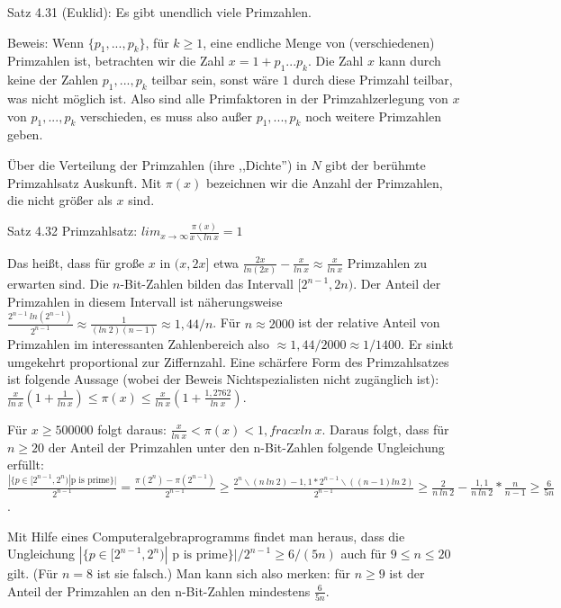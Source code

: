 \documentclass[a4paper]{article}
\begin{document}
\begin{multicols}{3}
        Satz 4.31 (Euklid): Es gibt unendlich viele Primzahlen.

        Beweis: Wenn $\{p_1,...,p_k\}$, für $k\geq 1$, eine endliche Menge von (verschiedenen) Primzahlen ist, betrachten wir die Zahl $x=1+p_1...p_k$. Die Zahl $x$ kann durch keine der Zahlen $p_1,...,p_k$ teilbar sein, sonst wäre $1$ durch diese Primzahl teilbar, was nicht möglich ist. Also sind alle Primfaktoren in der Primzahlzerlegung von $x$ von $p_1,...,p_k$ verschieden, es muss also außer $p_1,...,p_k$ noch weitere Primzahlen geben.

        Über die Verteilung der Primzahlen (ihre ,,Dichte'') in $N$ gibt der berühmte Primzahlsatz Auskunft. Mit $\pi(x)$ bezeichnen wir die Anzahl der Primzahlen, die nicht größer als $x$ sind.

        Satz 4.32 Primzahlsatz: $lim_{x\rightarrow \infty} \frac{\pi(x)}{x\backslash ln\ x}= 1$

        Das heißt, dass für große $x$ in $(x,2x]$ etwa $\frac{2x}{ln(2x)}-\frac{x}{ln\ x}\approx \frac{x}{ln\ x}$ Primzahlen zu erwarten sind. Die $n$-Bit-Zahlen bilden das Intervall $[2^{n-1} , 2n)$. Der Anteil der Primzahlen in diesem Intervall ist näherungsweise $\frac{2^{n-1}\ ln(2^{n-1})}{2^{n-1}}\approx \frac{1}{(ln\ 2)(n-1)}\approx 1,44/n$.
        Für $n\approx 2000$ ist der relative Anteil von Primzahlen im interessanten Zahlenbereich also $\approx 1,44/2000\approx 1/1400$. Er sinkt umgekehrt proportional zur Ziffernzahl.
        Eine schärfere Form des Primzahlsatzes ist folgende Aussage (wobei der Beweis Nichtspezialisten nicht zugänglich ist): $\frac{x}{ln\ x}(1+\frac{1}{ln\ x})\leq \pi(x)\leq \frac{x}{ln\ x}(1+\frac{1,2762}{ln\ x})$.

        Für $x\geq 500 000$ folgt daraus: $\frac{x}{ln\ x}< \pi(x)< 1, frac{x}{ln\ x}$.
        Daraus folgt, dass für $n\geq 20$ der Anteil der Primzahlen unter den n-Bit-Zahlen folgende Ungleichung erfüllt: $\frac{|\{p\in [2^{n-1}, 2^n)| \text{p is prime}\}|}{2^{n-1}} = \frac{\pi(2^n)-\pi(2^{n-1})}{2^{n-1}} \geq \frac{2^n\backslash (n\ ln\ 2)- 1,1*2^{n-1}\backslash ((n-1)ln\ 2)}{2^{n-1}}\geq \frac{2}{n\ ln\ 2}-\frac{1,1}{n\ ln\ 2}*\frac{n}{n-1}\geq \frac{6}{5n}$.

        Mit Hilfe eines Computeralgebraprogramms findet man heraus, dass die Ungleichung $|\{p\in [2^{n-1}, 2^n)|\text{ p is prime}\}|/2^{n-1} \geq 6 /(5n)$ auch für $9\leq n\leq 20$ gilt. (Für $n=8$ ist sie falsch.) Man kann sich also merken: für $n\geq 9$ ist der Anteil der Primzahlen an den n-Bit-Zahlen mindestens $\frac{6}{5n}$.


\end{multicols}
\end{document}
